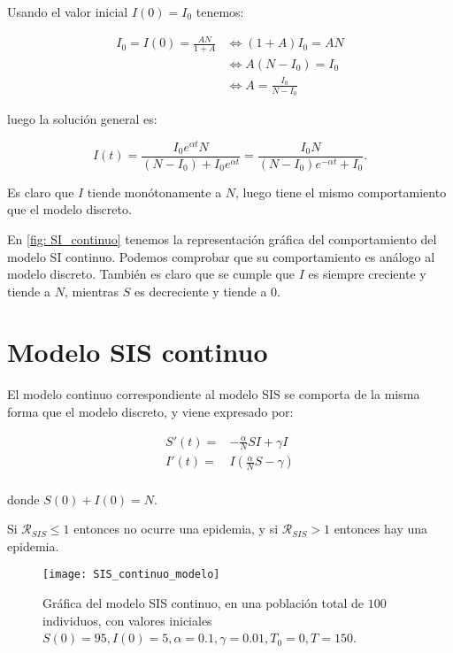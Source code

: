 Usando el valor inicial $I(0)=I_0$ tenemos:

\begin{equation}
\begin{aligned}
I_0 = I(0) = \frac{AN}{1+A} & \Leftrightarrow (1+A)I_0 = AN \\
& \Leftrightarrow A(N-I_0) = I_0 \\
& \Leftrightarrow A = \frac{I_0}{N-I_0}
\end {aligned}
\end{equation}

luego la solución general es:

$$I(t) = \frac{I_0e^{\alpha t}N}{(N-I_0)+I_0e^{\alpha t}} = \frac{I_0N}{(N-I_0)e^{-\alpha t}+I_0}.$$

Es claro que $I$ tiende monótonamente a $N$, luego tiene el mismo comportamiento que el modelo discreto.

En \eqref{fig: SI_continuo} tenemos la representación gráfica del comportamiento del modelo SI continuo. Podemos comprobar que su comportamiento es análogo al modelo discreto. También es claro que se cumple que $I$ es siempre creciente y tiende a $N$, mientras $S$ es decreciente y tiende a $0$.

\section{Modelo SIS continuo}

El modelo continuo correspondiente al modelo SIS se comporta de la misma forma que el modelo discreto, y viene expresado por:

\begin{equation}
\label{eqn: modelo_SIS_continuo}
\begin{aligned}
S'(t) = & -\frac{\alpha}{N}SI+\gamma I \\
I'(t) = & I\left( \frac{\alpha}{N}S-\gamma \right) \\
\end{aligned}
\end{equation}

donde $S(0)+I(0)=N$.

Si $\mathcal{R}_{SIS}\leq 1$ entonces no ocurre una epidemia, y si $\mathcal{R}_{SIS} > 1$ entonces hay una epidemia.

\begin{figure}
\begin{center}
\caption{Gráfica del modelo SIS continuo, en una población total de $100$ individuos, con valores iniciales $S(0)=95, I(0) = 5, \alpha = 0.1, \gamma = 0.01, T_0 = 0, T = 150$.}
\label{fig: SIS_continuo}
\texttt{[image: SIS\_continuo\_modelo]}
\end{center}
\end{figure}

